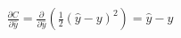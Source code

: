 \documentclass[preview]{standalone}
\begin{document}
\begin{align*}
\frac{\partial C}{\partial \hat{y}} = \frac{\partial }{\partial \hat{y}} \left(\frac{1}{2}(\hat{y} - y )^2\right) = \hat{y} - y
\end{align*}
\end{document}
